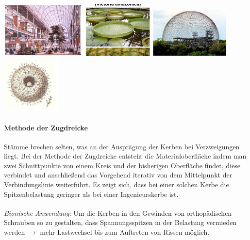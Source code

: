 \begin{center}
    \includegraphics[width=8cm]{lec7/figures/palast.png}
    \hfill
    \includegraphics[width=4cm]{lec7/figures/pavillon.png}
    \hfill
    \includegraphics[width=3cm]{lec7/figures/radularie.png}
\end{center}

\paragraph{Methode der Zugdreicke \dangersign} Stämme brechen selten, was an der Ausprägung der Kerben bei Verzweigungen liegt. Bei der Methode der Zugdreicke entsteht die Materialoberfläche indem man zwei Schnittpunkte von einem Kreis und der bisherigen Oberfläche findet, diese verbindet und anschließend das Vorgehend iterativ von dem Mittelpunkt der Verbindungslinie weiterführt. Es zeigt sich, dass bei einer solchen Kerbe die Spitzenbelastung geringer als bei einer Ingenieurskerbe ist.
\\\\
\textit{Bionische Anwendung:} Um die Kerben in den Gewinden von orthopädischen Schrauben so zu gestalten, dass Spannungsspitzen in der Belastung vermieden werden $\rightarrow$ mehr Lastwechsel bis zum Auftreten von Rissen möglich.

